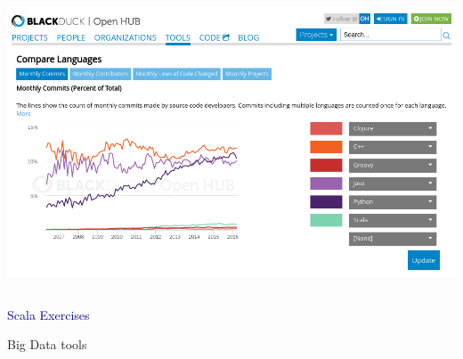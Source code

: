 \documentclass{beamer}
\begin{document}
\begin{frame}{}
\begin{columns}
\includegraphics[width=\linewidth]{popularity2.png}
\end{columns}
\end{frame}

\begin{frame}{}
\begin{center}
\Huge \textcolor{darkblue}{Scala Exercises}
\end{center}
\end{frame}

{
\begin{frame}{Big Data tools}
\end{frame}
}
\end{document}
